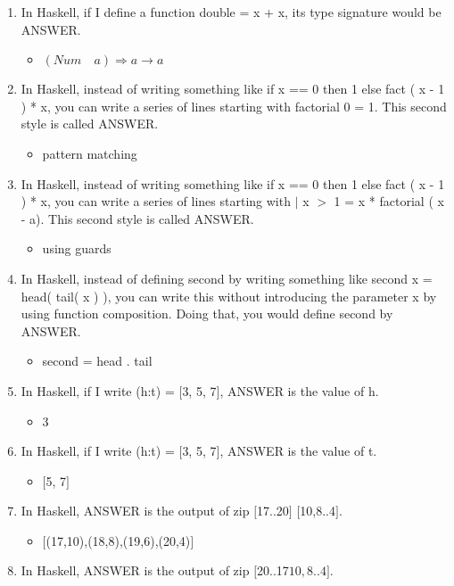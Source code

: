 \documentclass{exam}
\begin{document}
\begin{enumerate}
\item In Haskell, if I define a function double = x + x, its type signature would be ANSWER.
\begin{itemize}
\item $(Num \quad a) \Rightarrow a \rightarrow a$
\end{itemize}
\item In Haskell, instead of writing something like if x == 0 then 1 else fact ( x - 1 ) * x, you can write a series of lines starting with factorial 0 = 1.  This second style is called ANSWER.
\begin{itemize}
\item pattern matching
\end{itemize}
\item In Haskell, instead of writing something like if x == 0 then 1 else fact ( x - 1 ) * x, you can write a series of lines starting with $|$ x $>$ 1 = x * factorial ( x - a).  This second style is called ANSWER.
\begin{itemize}
\item using guards
\end{itemize}
\item In Haskell, instead of defining second by writing something like second x = head( tail(  x ) ), you can write this without introducing the parameter x by using function composition.  Doing that, you would define second by ANSWER.
\begin{itemize}
\item second = head . tail
\end{itemize}
\item In Haskell, if I write (h:t) = $\lbrack$3, 5, 7$\rbrack$, ANSWER is the value of h.
\begin{itemize}
\item 3
\end{itemize}
\item In Haskell, if I write (h:t) = $\lbrack$3, 5, 7$\rbrack$, ANSWER is the value of t.
\begin{itemize}
\item $\lbrack$5, 7$\rbrack$
\end{itemize}
\item In Haskell, ANSWER is the output of zip $\lbrack$17..20$\rbrack$ $\lbrack$10,8..4$\rbrack$.
\begin{itemize}
\item $\lbrack$(17,10),(18,8),(19,6),(20,4)$\rbrack$
\end{itemize}
\item In Haskell, ANSWER is the output of zip $\lbrack$20..17\rbrack$ $\lbrack$10,8..4\rbrack$.

\end{enumerate}
\end{document}

